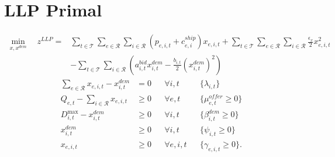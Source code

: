 \documentclass[11pt]{article}
\begin{document}
\section*{LLP Primal}
\begin{align}
\min_{x,x^{dem}} \quad
z^{LLP}
= {} &
\sum_{t\in\mathcal{T}}\sum_{e\in\mathcal{R}}\sum_{i\in\mathcal{R}}
\left(p_{e,i,t}+c^{ship}_{e,i}\right)x_{e,i,t}
+ \sum_{t\in\mathcal{T}}\sum_{e\in\mathcal{R}}\sum_{i\in\mathcal{R}}
\frac{\epsilon_x}{2}x_{e,i,t}^2
\nonumber\\
&-
\sum_{t\in\mathcal{T}}\sum_{i\in\mathcal{R}}
\left(
a^{bid}_{i,t}x^{dem}_{i,t}
- \frac{b_{i,t}}{2}(x^{dem}_{i,t})^2
\right)
\end{align}
\begin{align}
\sum_{e\in\mathcal{R}} x_{e,i,t} - x^{dem}_{i,t} &= 0
&& \forall i,t
&& \{\lambda_{i,t}\}
\label{eq:llp-bal}
\\
Q_{e,t} - \sum_{i\in\mathcal{R}} x_{e,i,t} &\ge 0
&& \forall e,t
&& \{\mu^{offer}_{e,t}\ge 0\}
\label{eq:llp-cap}
\\
D^{\max}_{i,t} - x^{dem}_{i,t} &\ge 0
&& \forall i,t
&& \{\beta^{dem}_{i,t}\ge 0\}
\label{eq:llp-dem-up}
\\
x^{dem}_{i,t} &\ge 0
&& \forall i,t
&& \{\psi_{i,t}\ge 0\}
\label{eq:llp-dem-lo}
\\
x_{e,i,t} &\ge 0
&& \forall e,i,t
&& \{\gamma_{e,i,t}\ge 0\}.
\label{eq:llp-x-lo}
\end{align}
\end{document}

